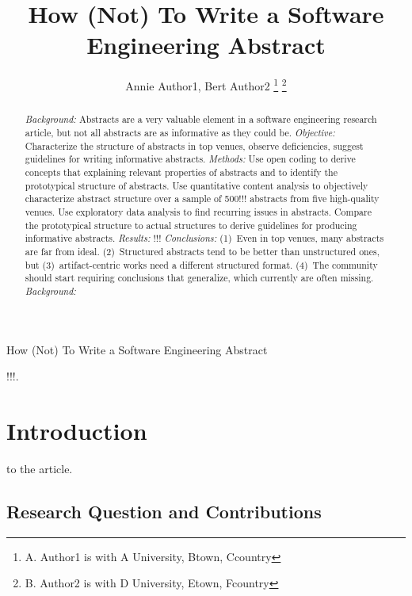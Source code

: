 \documentclass[10pt,journal,compsoc]{IEEEtran}
\begin{document}
	
\title{How (Not) To Write a Software Engineering Abstract}

\author{Annie Author1, Bert Author2
\thanks{A. Author1 is with A University, Btown, Ccountry}
\thanks{B. Author2 is with D University, Etown, Fcountry}}

%
{How (Not) To Write a Software Engineering Abstract}

\maketitle

\begin{abstract}  %
\emph{Background:}
Abstracts are a very valuable element in a software engineering research article,
but not all abstracts are as informative as they could be.
\emph{Objective:} 
Characterize the structure of abstracts in top venues, 
observe deficiencies, 
suggest guidelines for writing informative abstracts.
\emph{Methods:}
Use open coding to derive concepts that explaining relevant properties of abstracts
and to identify the prototypical structure of abstracts.
Use quantitative content analysis to objectively characterize abstract structure
over a sample of 500!!! abstracts from five high-quality venues.
Use exploratory data analysis to find recurring issues in abstracts.
Compare the prototypical structure to actual structures to derive
guidelines for producing informative abstracts.
\emph{Results:}
!!!
\emph{Conclusions:}
(1)~Even in top venues, many abstracts are far from ideal.
(2)~Structured abstracts tend to be better than unstructured ones, 
but (3)~artifact-centric works need a different structured format.
(4)~The community should start requiring conclusions that generalize, 
which currently are often missing.
\emph{Background:}

\end{abstract}

\begin{IEEEkeywords}
!!!.
\end{IEEEkeywords}


\section{Introduction}
 to the article.

\subsection{Research Question and Contributions}
\end{document}
